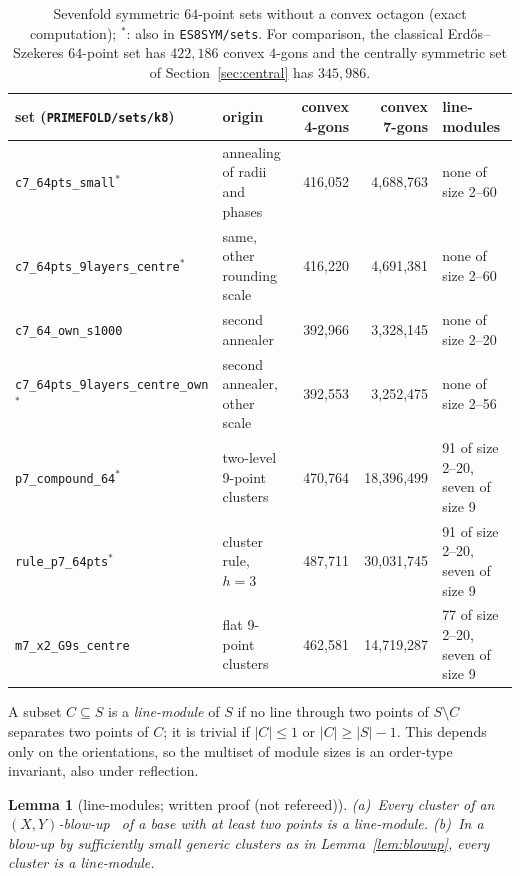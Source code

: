 \documentclass[10pt]{article}
\newtheorem{lemma}[theorem]{Lemma}
\theoremstyle{definition}
\theoremstyle{remark}
\begin{document}
\begin{table}[ht]
\centering\footnotesize
\begin{tabular}{@{}llrrl@{}}
\toprule
set (\texttt{PRIMEFOLD/sets/k8}) & origin & convex 4-gons & convex 7-gons & line-modules\\
\midrule
\texttt{c7\_64pts\_small}$^*$ & annealing of radii and phases & 416,052 & 4,688,763 & none of size 2--60\\
\texttt{c7\_64pts\_9layers\_centre}$^*$ & same, other rounding scale & 416,220 & 4,691,381 & none of size 2--60\\
\texttt{c7\_64\_own\_s1000} & second annealer & 392,966 & 3,328,145 & none of size 2--20\\
\texttt{c7\_64pts\_9layers\_centre\_own}$^*$ & second annealer, other scale & 392,553 & 3,252,475 & none of size 2--56\\
\texttt{p7\_compound\_64}$^*$ & two-level 9-point clusters & 470,764 & 18,396,499 & 91 of size 2--20, seven of size 9\\
\texttt{rule\_p7\_64pts}$^*$ & cluster rule, $h=3$ & 487,711 & 30,031,745 & 91 of size 2--20, seven of size 9\\
\texttt{m7\_x2\_G9s\_centre} & flat 9-point clusters & 462,581 & 14,719,287 & 77 of size 2--20, seven of size 9\\
\bottomrule
\end{tabular}
\caption{Sevenfold symmetric $64$-point sets without a convex octagon (exact computation); $^*$: also in
\texttt{ES8SYM/sets}. For comparison, the classical Erd\H{o}s--Szekeres $64$-point set has $422{,}186$ convex $4$-gons
and the centrally symmetric set of Section~\ref{sec:central} has $345{,}986$.}
\label{tab:c7}
\end{table}

A subset $C\subseteq S$ is a \emph{line-module} of $S$ if no line through two points of $S\setminus C$ separates two
points of $C$; it is trivial if $|C|\le1$ or $|C|\ge|S|-1$. This depends only on the orientations, so the multiset of
module sizes is an order-type invariant, also under reflection.

\begin{lemma}[line-modules; written proof (not refereed)]\label{lem:modules}
(a)~Every cluster of an $(X,Y)$-blow-up~\cite[Def.~13]{BB25} of a base with at least two points is a line-module.
(b)~In a blow-up by sufficiently small generic clusters as in Lemma~\ref{lem:blowup}, every cluster is a line-module.
\end{lemma}
\end{document}
